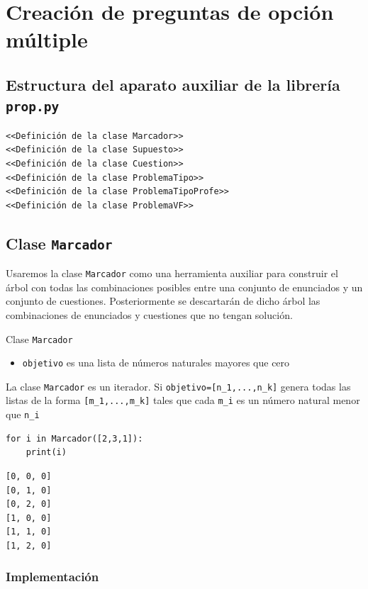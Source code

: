 \documentclass[10pt,a4paper]{report}
\begin{document}
\part{Creación de preguntas de opción múltiple}
\label{sec:org5ba94c4}

\chapter{Estructura del aparato auxiliar de la librería \texttt{prop.py}}
\label{sec:orgdf2fea3}

\begin{verbatim}
<<Definición de la clase Marcador>>
<<Definición de la clase Supuesto>>
<<Definición de la clase Cuestion>>
<<Definición de la clase ProblemaTipo>>
<<Definición de la clase ProblemaTipoProfe>>
<<Definición de la clase ProblemaVF>>
\end{verbatim}
\chapter{Clase \texttt{Marcador}}
\label{sec:orgf840024}

Usaremos la clase \texttt{Marcador} como una herramienta auxiliar para construir el árbol con todas las combinaciones posibles entre una conjunto de enunciados y un conjunto de cuestiones. 
Posteriormente se descartarán de dicho árbol las combinaciones de enunciados y cuestiones que no tengan solución.

Clase \texttt{Marcador}
\begin{itemize}
\item \texttt{objetivo} es una lista de números naturales mayores que cero
\end{itemize}

La clase \texttt{Marcador} es un iterador. Si \texttt{objetivo=[n\_1,...,n\_k]} genera todas las listas de la forma \texttt{[m\_1,...,m\_k]} tales que cada \texttt{m\_i} es un número natural menor que \texttt{n\_i}
\begin{verbatim}
for i in Marcador([2,3,1]):
    print(i)
\end{verbatim}

\label{}
\begin{verbatim}
[0, 0, 0]
[0, 1, 0]
[0, 2, 0]
[1, 0, 0]
[1, 1, 0]
[1, 2, 0]
\end{verbatim}
\section{Implementación}
\label{sec:org0496d78}
\end{document}
